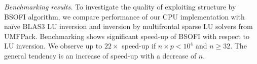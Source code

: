 \documentclass{llncs}
\begin{document}
\textit%
{Benchmarking results.}\label{sec:benchmarking}
%
%
To investigate the quality of exploiting structure by BSOFI algorithm,
we compare performance of our 
CPU implementation with na\"ive BLAS3 LU inversion 
and inversion by multifrontal sparse LU solvers from {\sc UMFPack}. 
Benchmarking shows %
significant speed-up 
of BSOFI with respect to LU inversion. %
We observe up to $22\times$ speed-up if $n\times p < 10^4$ and $n \ge 32$. 
The general tendency is an increase of speed-up with a decrease of $n$.


\end{document}
